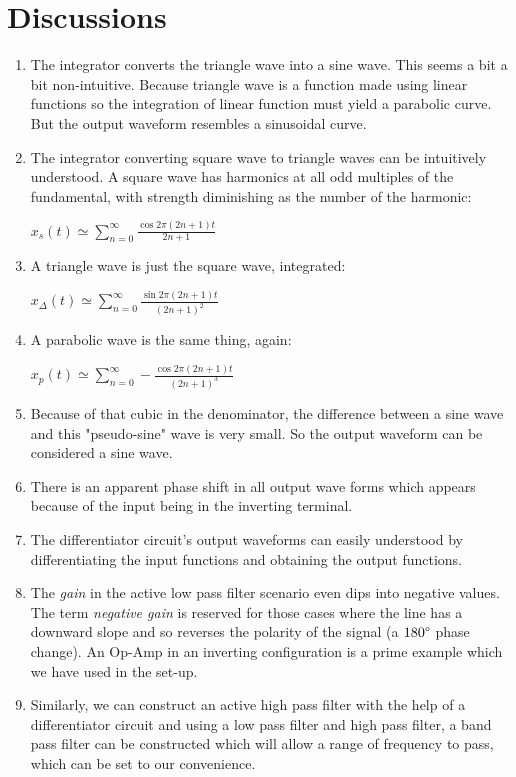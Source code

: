 \section{Discussions}
\begin{enumerate}
    \item The integrator converts the triangle wave into a sine wave. This seems a bit a bit non-intuitive. Because triangle wave is a function made using linear functions so the integration of linear function must yield a parabolic curve. But the output waveform resembles a sinusoidal curve.
    \item The integrator converting square wave to triangle waves can be intuitively understood. A square wave has harmonics at all odd multiples of the fundamental, with strength diminishing as the number of the harmonic:
    \begin{center}
        $x_s(t) \simeq \sum_{n = 0}^\infty \frac{\cos 2 \pi (2n + 1) t}{2n + 1}$
    \end{center}
    \item A triangle wave is just the square wave, integrated:
    \begin{center}
        $x_\Delta(t) \simeq \sum_{n = 0}^\infty \frac{\sin 2 \pi (2n + 1) t}{(2n + 1)^2}$
    \end{center}
    \item A parabolic wave is the same thing, again:
    \begin{center}
        $x_p(t) \simeq \sum_{n = 0}^\infty -\frac{\cos 2 \pi (2n + 1) t}{(2n + 1)^3}$
    \end{center}
    \item Because of that cubic in the denominator, the difference between a sine wave and this "pseudo-sine" wave is very small. So the output waveform can be considered a sine wave.
    \item There is an apparent phase shift in all output wave forms which appears because of the input being in the inverting terminal.
    \item The differentiator circuit's output waveforms can easily understood by differentiating the input functions and obtaining the output functions.
    \item The \emph{gain} in the active low pass filter scenario even dips into negative values. The term \emph{negative gain} is reserved for those cases where the line has a downward slope and so reverses the polarity of the signal (a $180 \degree$ phase change). An Op-Amp in an inverting configuration is a prime example which we have used in the set-up.
    \item Similarly, we can construct an active high pass filter with the help of a differentiator circuit and using a low pass filter and high pass filter, a band pass filter can be constructed which will allow a range of frequency to pass, which can be set to our convenience. 
\end{enumerate}
